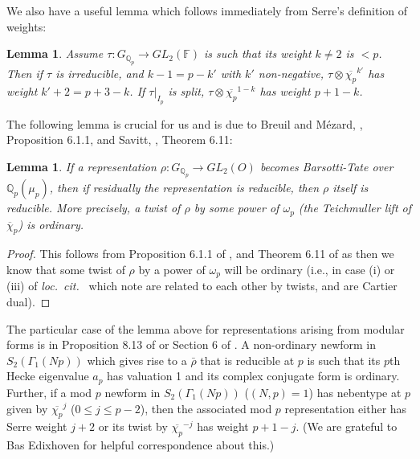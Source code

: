 \documentclass[12pt]{amsart}
\newcommand{\Q}{\mathbb{Q}}
\newcommand{\rhobar}{\overline{\rho}}
\newtheorem{lemma}[theorem]{Lemma}
\def\rhobar{ {\bar {\rho} } }
\newcommand{\F}{{\mathbb F}}
\begin{document}
We also have a useful lemma which follows immediately from Serre's definition of weights:

\begin{lemma}\label{weights}
  Assume $\tau:G_{\Q_p} \rightarrow GL_2(\F)$ is such that its weight $k 
\neq 2$ is $<p$. Then if $\tau$ is irreducible,
  and $k-1=p-k'$ with $k'$ non-negative, $\tau \otimes \overline{\chi_p}^{k'}$ has weight $k'+2=p+3-k$. If $\tau|_{I_p}$ is
  split, $\tau \otimes \overline{\chi_p}^{1-k}$ has weight $p+1-k$.
\end{lemma}

The following lemma is crucial for us and is due to Breuil and M\'ezard, \cite{BM}, Proposition 6.1.1, and Savitt, \cite{Savitt1}, Theorem 6.11:

\begin{lemma}\label{breuil}
If a representation $\rho: G_{\Q_p} \rightarrow GL_2({ O})$ 
becomes Barsotti-Tate over $\Q_p(\mu_p)$, then if residually the representation is reducible, then $\rho$ itself is reducible. More precisely, a twist of
$\rho$ by some power of $\omega_p$ (the Teichmuller lift of $\overline \chi_p$) is ordinary.
\end{lemma}

\begin{proof}
This follows from Proposition 6.1.1 of \cite{BM}, and Theorem 6.11 of \cite{Savitt1} as then we know that some twist of $\rho$ by a power of $\omega_p$ will be ordinary (i.e., in case (i) or (iii) of {\it loc.\ cit.\ } which note are related to each other by twists, and are Cartier dual).
\end{proof}

\vspace{3mm}

 The particular case of the lemma above for representations arising from modular forms is in Proposition 8.13 of \cite{Gross} or Section 6 of \cite{Edix}.
{\small A non-ordinary newform in $S_2(\Gamma_1(Np))$
which gives rise to a  $\rhobar$ that is reducible at $p$ is such that its $p$th Hecke eigenvalue $a_p$ has valuation 1 and its complex conjugate form is ordinary.} Further, if a mod $p$ newform in $S_2(\Gamma_1(Np))$ ($(N,p)=1$) has nebentype at $p$ given by 
$\overline{\chi_p}^j$ ($0 \leq j \leq p-2$), then the associated mod $p$ representation either has Serre weight $j+2$ or its twist by $\overline{\chi_p}^{-j}$ has weight $p+1-j$. (We are grateful to Bas Edixhoven for helpful correspondence about this.)
\end{document}
